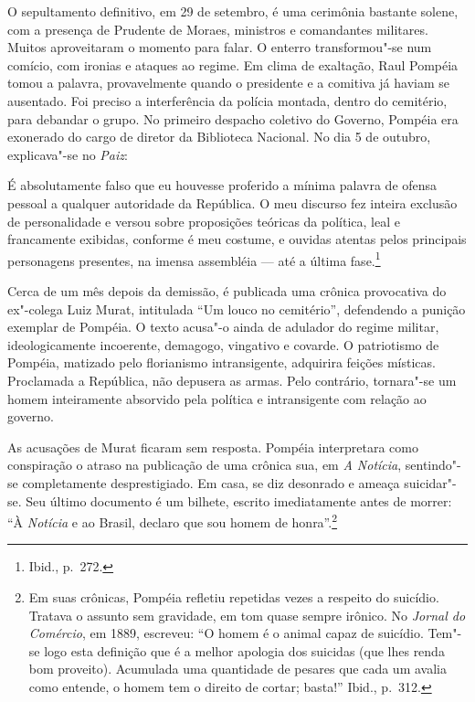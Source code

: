 O sepultamento definitivo, em 29 de setembro, é uma
cerimônia bastante solene, com a presença de Prudente de Moraes,
ministros e comandantes militares. Muitos aproveitaram o momento para
falar. O enterro transformou"-se num comício, com ironias e ataques ao
regime. Em clima de exaltação, Raul Pompéia tomou a palavra,
provavelmente quando o presidente e a comitiva já haviam se ausentado.
Foi preciso a interferência da polícia montada, dentro do cemitério,
para debandar o grupo. No primeiro despacho coletivo do Governo,
Pompéia era exonerado do cargo de diretor da Biblioteca Nacional. No
dia 5 de outubro, explicava"-se no \textit{Paiz}:

\begin{hedraquote}
É absolutamente falso que eu houvesse proferido a mínima
palavra de ofensa pessoal a qualquer autoridade da República. O meu
discurso fez inteira exclusão de personalidade e versou sobre
proposições teóricas da política, leal e francamente exibidas, conforme
é meu costume, e ouvidas atentas pelos principais personagens
presentes, na imensa assembléia --- até a última fase.\footnote{Ibid., p.~272.} 
\end{hedraquote}


Cerca de um mês depois da demissão, é publicada uma crônica provocativa
do ex"-colega Luiz Murat, intitulada ``Um louco no cemitério'',
defendendo a punição exemplar de Pompéia. O texto acusa"-o ainda de
adulador do regime militar, ideologicamente incoerente, demagogo,
vingativo e covarde. O patriotismo de Pompéia, matizado pelo
florianismo intransigente, adquirira feições místicas. Proclamada a
República, não depusera as armas. Pelo contrário, tornara"-se um homem
inteiramente absorvido pela política e intransigente com relação ao
governo.

As acusações de Murat ficaram sem resposta. Pompéia
interpretara como conspiração o atraso na publicação de uma crônica
sua, em \textit{A Notícia}, sentindo"-se
completamente desprestigiado. Em casa, se diz desonrado e ameaça
suicidar"-se. Seu último documento é um bilhete, escrito imediatamente
antes de morrer: ``À \textit{Notícia} e ao
Brasil, declaro que sou homem de honra''.\footnote{Em suas crônicas, 
Pompéia refletiu repetidas vezes a respeito do suicídio.
Tratava o assunto sem gravidade, em tom quase sempre irônico. No
\textit{Jornal do Comércio}, em 1889,
escreveu: ``O homem é o animal capaz de suicídio. Tem"-se logo esta
definição que é a melhor apologia dos suicidas (que lhes renda bom
proveito). Acumulada uma quantidade de pesares que cada um avalia como
entende, o homem tem o direito de cortar; basta!'' Ibid., p.~312.}

